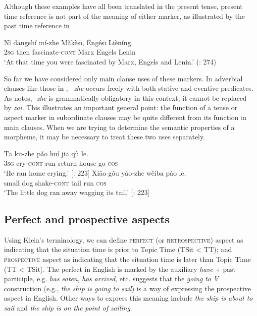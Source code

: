 Although these examples have all been translated in the present tense, present time reference is not part of the meaning of either marker, as illustrated by the past time reference in .


\ea \label{ex:20.26}
\gll Nǐ  dāngshí  mí-zhe  Mǎkès\={\i},  \=Engés\={\i}  Lièníng.\\
\textsc{2sg}  then  fascinate-\textsc{cont}  Marx  Engels  Lenin\\
\glt ‘At that time you were fascinated by Marx, Engels and Lenin.’  (\citealt{Smith1997}: 274)
\z


So far we have considered only main clause uses of these markers. In adverbial clauses like those in , \textit{–zhe} occurs freely with both stative and eventive predicates. As \citet[275]{Smith1997} notes, \textit{-zhe} is grammatically obligatory in this context; it cannot be replaced by \textit{zai}. This illustrates an important general point: the function of a tense or aspect marker in subordinate clauses may be quite different from its function in main clauses. When we are trying to determine the semantic properties of a morpheme, it may be necessary to treat these two uses separately.


\ea \label{ex:20.27}
\ea  \gll Tā  k\=u-zhe  pǎo  huí  jiā  qù  le.\\
\textsc{3sg}  cry-\textsc{cont}  run  return  house  go  \textsc{cos}\\
\glt ‘He ran home crying.’  [\citealt{LiThompson1981}: 223]
\ex \gll  Xiǎo  gǒu  yáo-zhe  wěiba  pǎo  le.\\
small  dog  shake-\textsc{cont}  tail  run  \textsc{cos}\\
\glt ‘The little dog ran away wagging its tail.’  [\citealt{LiThompson1981}: 223]
\z \z

\subsection{Perfect and prospective aspects}\label{sec:20.4.3}

Using Klein’s terminology, we can define \textsc{perfect} (or \textsc{retrospective}) aspect as indicating that the situation time is prior to Topic Time (TSit < TT); and \textsc{prospective} aspect as indicating that the situation time is later than Topic Time (TT < TSit). The perfect in English is marked by the auxiliary \textit{have} + past participle, e.g. \textit{has eaten}, \textit{has arrived}, etc. \citet[64]{Comrie1976} suggests that the \textit{going to V} construction (e.g., \textit{the ship is going to sail}) is a way of expressing the prospective aspect in English. Other ways to express this meaning include \textit{the ship is about to sail} and \textit{the ship is on the point of sailing}.



